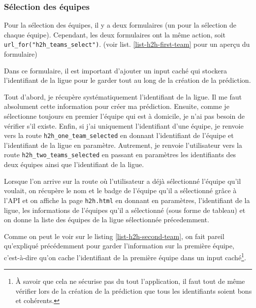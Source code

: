 \documentclass[a4paper,14pt]{extarticle}
\begin{document}
{

\subsubsection{Sélection des équipes}

Pour la sélection des équipes, il y a deux formulaires (un pour la sélection de chaque équipe). Cependant, les deux formulaires ont la même action, soit \texttt{url\_for("h2h\_teams\_select")}. (voir list. \ref{list-h2h-first-team} pour un aperçu du formulaire)


Dans ce formulaire, il est important d'ajouter un input caché qui stockera l'identifiant de la ligue pour le garder tout au long de la création de la prédiction.


Tout d'abord, je récupère systématiquement l'identifiant de la ligue. Il me faut absolument cette information pour créer ma prédiction. Ensuite, comme je sélectionne toujours en premier l'équipe qui est à domicile, je n'ai pas besoin de vérifier s'il existe. Enfin, si j'ai uniquement l'identifiant d'une équipe, je renvoie vers la route \texttt{h2h\_one\_team\_selected} en donnant l'identifiant de l'équipe et l'identifiant de la ligue en paramètre. Autrement, je renvoie l'utilisateur vers la route \texttt{h2h\_two\_teams\_selected} en passant en paramètres les identifiants des deux équipes ainsi que l'identifiant de la ligue.


Lorsque l'on arrive sur la route où l'utilisateur a déjà sélectionné l'équipe qu'il voulait, on récupère le nom et le badge de l'équipe qu'il a sélectionné grâce à l'API et on affiche la page \texttt{h2h.html} en donnant en paramètres, l'identifiant de la ligue, les informations de l'équipes qu'il a sélectionné (sous forme de tableau) et on donne la liste des équipes de la ligue sélectionnée précedemment.


Comme on peut le voir sur le listing \ref{list-h2h-second-team}, on fait pareil qu'expliqué précédemment pour garder l'information sur la première équipe, c'est-à-dire qu'on cache l'identifiant de la première équipe dans un input caché\footnote{À savoir que cela ne sécurise pas du tout l'application, il faut tout de même vérifier lors de la création de la prédiction que tous les identifiants soient bons et cohérents.}.

}
\end{document}

